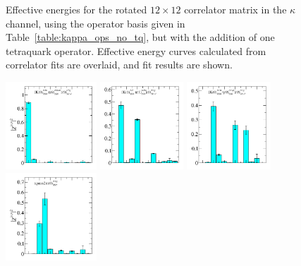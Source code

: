 \begin{figure}
  \caption[Effective energies for the rotated $12\times 12$ correlator matrix in the $\kappa$ channel, using the operator basis given in Table~\ref{table:kappa_ops_no_tq}, but with the addition of one tetraquark operator.]{Effective energies for the rotated $12\times 12$ correlator matrix in the $\kappa$ channel, using the operator basis given in Table~\ref{table:kappa_ops_no_tq}, but with the addition of one tetraquark operator. Effective energy curves calculated from correlator fits are overlaid, and fit results are shown.}
  \label{fig:kappa_with_tq_grid}
\end{figure}

\begin{figure}
  \includegraphics[width=0.304\textwidth]{figures/spectrum_a1g/with_tq/zfactors/zfactor_isodoublet_kaon_pion-A1g_1-P000-A1u-SS_0-P000-A1um-SS_0.pdf}
  \includegraphics[width=0.28\textwidth]{figures/spectrum_a1g/with_tq/zfactors/zfactor_isodoublet_kaon_pion-A1g_1-P001-A2-SS_1-P00-1-A2m-SS_1.pdf}
  \includegraphics[width=0.28\textwidth]{figures/spectrum_a1g/with_tq/zfactors/zfactor_isodoublet_kaon_eta-A1g_1-P000-A1u-SS_0-P000-A1up-SS_0.pdf}\\
  \includegraphics[width=0.304\textwidth]{figures/spectrum_a1g/with_tq/zfactors/zfactor_tqsuss2m-P000-A1g_1-SS_2.pdf}

\end{figure}
